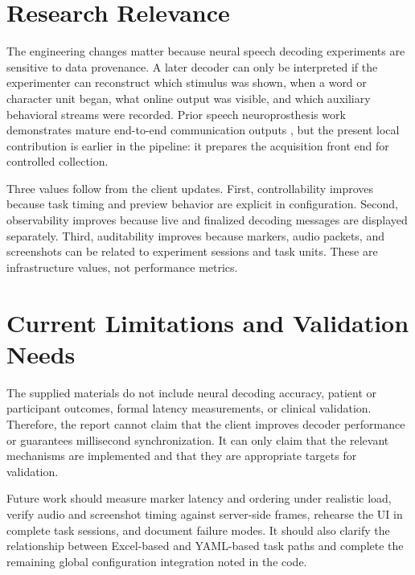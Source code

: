 \documentclass[11pt]{article}
\begin{document}
\section{Research Relevance}
The engineering changes matter because neural speech decoding experiments are sensitive to data provenance. A later decoder can only be interpreted if the experimenter can reconstruct which stimulus was shown, when a word or character unit began, what online output was visible, and which auxiliary behavioral streams were recorded. Prior speech neuroprosthesis work demonstrates mature end-to-end communication outputs \cite{Moses2021NEJM,Makin2020NatNeurosci}, but the present local contribution is earlier in the pipeline: it prepares the acquisition front end for controlled collection.

Three values follow from the client updates. First, controllability improves because task timing and preview behavior are explicit in configuration. Second, observability improves because live and finalized decoding messages are displayed separately. Third, auditability improves because markers, audio packets, and screenshots can be related to experiment sessions and task units. These are infrastructure values, not performance metrics.

\section{Current Limitations and Validation Needs}
The supplied materials do not include neural decoding accuracy, patient or participant outcomes, formal latency measurements, or clinical validation. Therefore, the report cannot claim that the client improves decoder performance or guarantees millisecond synchronization. It can only claim that the relevant mechanisms are implemented and that they are appropriate targets for validation.

Future work should measure marker latency and ordering under realistic load, verify audio and screenshot timing against server-side frames, rehearse the UI in complete task sessions, and document failure modes. It should also clarify the relationship between Excel-based and YAML-based task paths and complete the remaining global configuration integration noted in the code.
\end{document}
